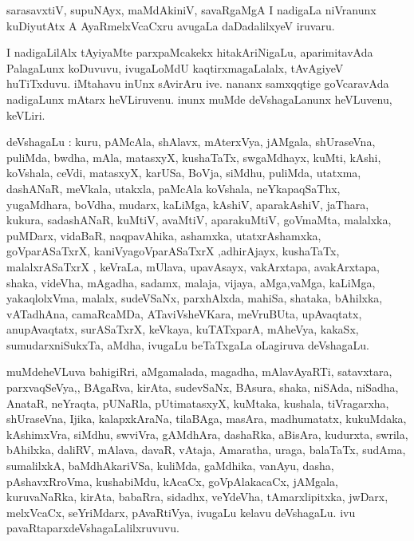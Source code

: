 \documentclass{article}
\begin{document}
\begin{mn}
sarasavxtiV, supuNAyx, maMdAkiniV, savaRgaMgA I nadigaLa niVranunx kuDiyutAtx A AyaRmelxVcaCxru
avugaLa daDadalilxyeV iruvaru.
\end{mn}

\begin{mn}
I nadigaLilAlx tAyiyaMte parxpaMcakekx hitakAriNigaLu, aparimitavAda PalagaLunx koDuvuvu, 
ivugaLoMdU kaqtirxmagaLalalx, tAvAgiyeV huTiTxduvu. iMtahavu inUnx sAvirAru ive.
nananx samxqqtige goVcaravAda nadigaLunx mAtarx heVLiruvenu. inunx muMde deVshagaLanunx
heVLuvenu, keVLiri.
\end{mn}

\begin{mn}
deVshagaLu : kuru, pAMcAla, shAlavx, mAterxVya, jAMgala, shUraseVna, puliMda, bwdha, mAla, 
matasxyX, kushaTaTx, swgaMdhayx, kuMti, kAshi, koVshala, ceVdi, matasxyX, karUSa, BoVja, siMdhu, 
puliMda, utatxma, dashANaR, meVkala, utakxla, paMcAla koVshala, neYkapaqSaThx, yugaMdhara, 
boVdha, mudarx, kaLiMga, kAshiV, aparakAshiV, jaThara, kukura, sadashANaR, kuMtiV, 
avaMtiV, aparakuMtiV, goVmaMta, malalxka, puMDarx, vidaBaR, naqpavAhika, ashamxka, utatxrAshamxka,
goVparASaTxrX, kaniVyagoVparASaTxrX ,adhirAjayx, kushaTaTx, malalxrASaTxrX , keVraLa, mUlava, 
upavAsayx, vakArxtapa, avakArxtapa, shaka, videVha,
mAgadha, sadamx, malaja, vijaya, aMga,vaMga, kaLiMga, yakaqlolxVma, malalx, sudeVSaNx,
parxhAlxda, mahiSa, shataka, bAhilxka, vATadhAna, camaRcaMDa, ATaviVsheVKara, 
meVruBUta, upAvaqtatx, anupAvaqtatx, surASaTxrX, keVkaya, kuTATxparA, mAheVya, kakaSx, 
sumudarxniSukxTa, aMdha, ivugaLu beTaTxgaLa oLagiruva deVshagaLu.
\end{mn}

\begin{mn}
muMdeheVLuva bahigiRri, aMgamalada, magadha, mAlavAyaRTi, satavxtara, parxvaqSeVya,, BAgaRva, 
kirAta, sudevSaNx, BAsura, shaka, niSAda, niSadha, AnataR, neYraqta, pUNaRla, 
pUtimatasxyX, kuMtaka, kushala, tiVragarxha, shUraseVna, Ijika, kalapxkAraNa,
tilaBAga, masAra, madhumatatx, kukuMdaka, kAshimxVra, siMdhu, swviVra, gAMdhAra, dashaRka,
aBisAra, kudurxta, swrila, bAhilxka, daliRV, mAlava, davaR, vAtaja, Amaratha, uraga, balaTaTx, 
sudAma, sumalilxkA, baMdhAkariVSa, kuliMda, gaMdhika, vanAyu, dasha, pAshavxRroVma, kushabiMdu,
kAcaCx, goVpAlakacaCx, jAMgala, kuruvaNaRka, kirAta, babaRra, sidadhx, veYdeVha, 
tAmarxlipitxka, jwDarx, melxVcaCx, seYriMdarx, pAvaRtiVya, ivugaLu kelavu deVshagaLu. 
ivu pavaRtaparxdeVshagaLalilxruvuvu.
\end{mn}
\end{document}
